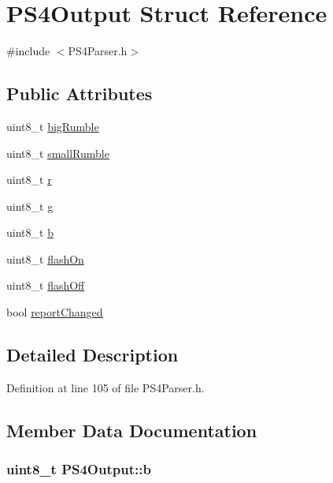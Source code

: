 \hypertarget{struct_p_s4_output}{\section{\-P\-S4\-Output \-Struct \-Reference}
\label{struct_p_s4_output}
}


{\ttfamily \#include $<$\-P\-S4\-Parser.\-h$>$}

\subsection*{\-Public \-Attributes}
\begin{DoxyCompactItemize}
\item 
uint8\-\_\-t \hyperlink{struct_p_s4_output_ac9e9e57cfce3e7b9588abb273bd908ec}{big\-Rumble}
\item 
uint8\-\_\-t \hyperlink{struct_p_s4_output_a8c6030198733f66a5cb96b8a49e07618}{small\-Rumble}
\item 
uint8\-\_\-t \hyperlink{struct_p_s4_output_a76a85e749899e2e6cb135a6ec6acabb3}{r}
\item 
uint8\-\_\-t \hyperlink{struct_p_s4_output_afc78d4e2c0aafbf4b0a27db3746ad93c}{g}
\item 
uint8\-\_\-t \hyperlink{struct_p_s4_output_a237a65d5e6deff4a2ef1ca97c7383777}{b}
\item 
uint8\-\_\-t \hyperlink{struct_p_s4_output_a4abdb9a24e512f7f2bad16df28b2fcab}{flash\-On}
\item 
uint8\-\_\-t \hyperlink{struct_p_s4_output_a3f4dcb81acca1475402b93ac851b7be8}{flash\-Off}
\item 
bool \hyperlink{struct_p_s4_output_aff395d1c46c9016ab4ea8ddbf034788b}{report\-Changed}
\end{DoxyCompactItemize}


\subsection{\-Detailed \-Description}


\-Definition at line 105 of file \-P\-S4\-Parser.\-h.



\subsection{\-Member \-Data \-Documentation}
\hypertarget{struct_p_s4_output_a237a65d5e6deff4a2ef1ca97c7383777}{
\subsubsection[{b}]{\setlength{\rightskip}{0pt plus 5cm}uint8\-\_\-t {\bf \-P\-S4\-Output\-::b}}}\label{struct_p_s4_output_a237a65d5e6deff4a2ef1ca97c7383777}


